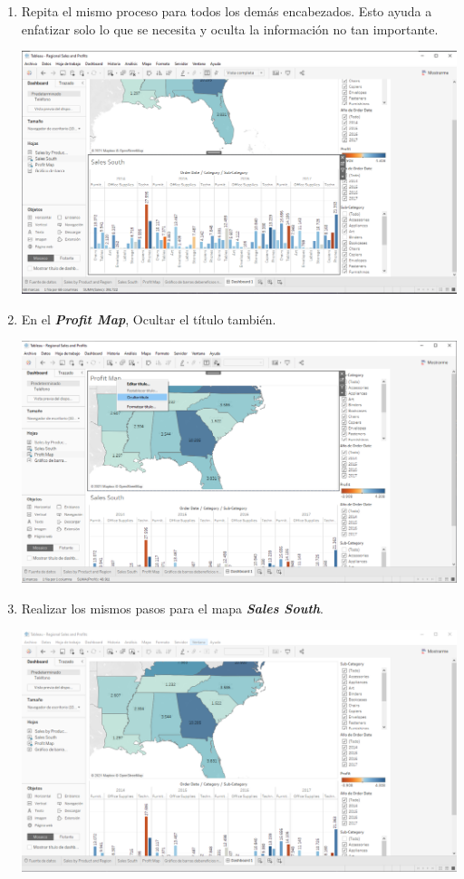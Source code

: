 \documentclass[12pt,letterpaper]{article}
\begin{document}
\begin{enumerate}
\begin{center}
        \end{center}
        \item Repita el mismo proceso para todos los demás encabezados. Esto ayuda a enfatizar solo lo que se necesita y oculta la información no tan importante.
        \begin{center}
            \includegraphics[width=15cm]{./img/img72.png}
        \end{center}
        \item En el \textit{\textbf{Profit Map}}, Ocultar el título también.
        \begin{center}
            \includegraphics[width=15cm]{./img/img73.png}
        \end{center}
        \item Realizar los mismos pasos para el mapa \textit{\textbf{Sales South}}.
        \begin{center}
            \includegraphics[width=15cm]{./img/img74.png}

\end{center}
\end{enumerate}
\end{document}
